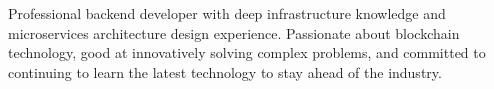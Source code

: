 

\begin{cvparagraph}

Professional backend developer with deep infrastructure knowledge and microservices architecture design experience. Passionate about blockchain technology, good at innovatively solving complex problems, and committed to continuing to learn the latest technology to stay ahead of the industry.
\end{cvparagraph}
